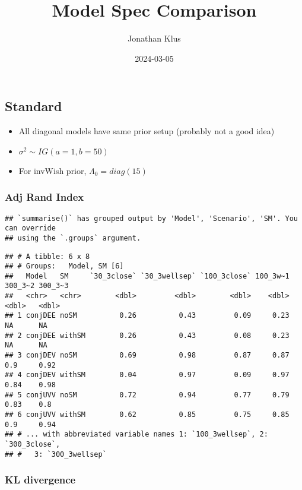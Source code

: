 \documentclass[
]{article}
\title{Model Spec Comparison}
\author{Jonathan Klus}
\date{2024-03-05}
\providecommand{\tightlist}{%
  \setlength{\itemsep}{0pt}\setlength{\parskip}{0pt}}
\begin{document}
\maketitle

\hypertarget{standard}{%
\subsection{Standard}\label{standard}}

\begin{itemize}
\tightlist
\item
  All diagonal models have same prior setup (probably not a good idea)
\item
  \(\sigma^2 \sim IG(a=1, b=50)\)
\item
  For invWish prior, \(\Lambda_0 = diag(15)\)
\end{itemize}

\hypertarget{adj-rand-index}{%
\subsubsection{Adj Rand Index}\label{adj-rand-index}}

\begin{verbatim}
## `summarise()` has grouped output by 'Model', 'Scenario', 'SM'. You can override
## using the `.groups` argument.
\end{verbatim}

\begin{verbatim}
## # A tibble: 6 x 8
## # Groups:   Model, SM [6]
##   Model   SM     `30_3close` `30_3wellsep` `100_3close` 100_3w~1 300_3~2 300_3~3
##   <chr>   <chr>        <dbl>         <dbl>        <dbl>    <dbl>   <dbl>   <dbl>
## 1 conjDEE noSM          0.26          0.43         0.09     0.23   NA      NA   
## 2 conjDEE withSM        0.26          0.43         0.08     0.23   NA      NA   
## 3 conjDEV noSM          0.69          0.98         0.87     0.87    0.9     0.92
## 4 conjDEV withSM        0.04          0.97         0.09     0.97    0.84    0.98
## 5 conjUVV noSM          0.72          0.94         0.77     0.79    0.83    0.8 
## 6 conjUVV withSM        0.62          0.85         0.75     0.85    0.9     0.94
## # ... with abbreviated variable names 1: `100_3wellsep`, 2: `300_3close`,
## #   3: `300_3wellsep`
\end{verbatim}

\hypertarget{kl-divergence}{%
\subsubsection{KL divergence}\label{kl-divergence}}
\end{document}

